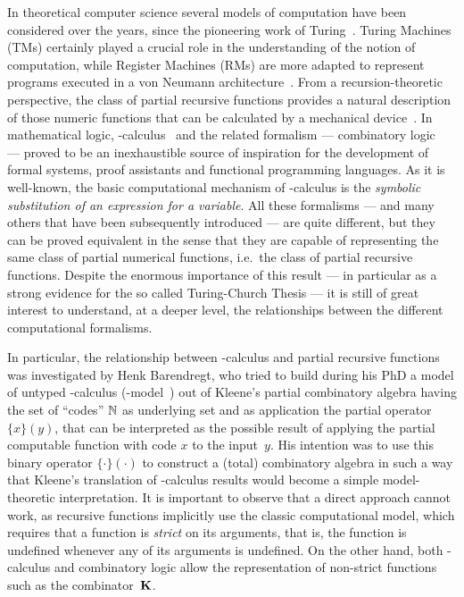 In theoretical computer science several models of computation have been considered over the years, since the pioneering work of Turing~\cite{Turing36}.
Turing Machines (TMs) certainly played a crucial role in the understanding of the notion of computation, while Register Machines (RMs) are more adapted to represent programs executed in a von Neumann architecture~\cite{Rogers67}.
From a recursion-theoretic perspective, the class of partial recursive functions provides a natural description of those numeric functions that can be calculated by a mechanical device~\cite{Kleene36}.
In mathematical logic, \lam-calculus~\cite{Bare} and the related formalism --- combinatory logic~\cite{CurryF58} --- proved to be an inexhaustible source of inspiration for the development of formal systems, proof assistants and functional programming languages. As it is well-known, the basic computational mechanism of \lam-calculus is the {\em symbolic substitution of an expression for a variable}.
All these formalisms --- and many others that have been subsequently introduced --- are quite different, but they can be proved equivalent in the sense that they are capable of representing the same class of partial numerical functions, i.e.\ the class of partial recursive functions.
Despite the enormous importance of this result --- in particular as a strong evidence for the so called Turing-Church Thesis --- it is still of great interest to understand, at a deeper level, the relationships between the different computational formalisms.

In particular, the relationship between \lam-calculus and partial recursive functions was investigated by Henk Barendregt, who tried to build during his PhD a model of untyped \lam-calculus (\lam-model~\cite{Koymans82,Meyer82}) out of Kleene's partial combinatory algebra having the set of ``codes'' $\mathbb{N}$ as underlying set and as application the partial operator $\{x\}(y)$, that can be interpreted as the possible result of applying the partial computable function with code $x$ to the input~$y$.
His intention was to use this binary operator $\{\cdot\}(\cdot)$ to construct a (total) combinatory algebra in such a way that Kleene's translation of \lam-calculus results would become a simple model-theoretic interpretation. It is important to observe that a direct approach cannot work, as recursive functions implicitly use the classic computational model, which requires that a function is \emph{strict} on its arguments, that is, the function is undefined whenever any of its arguments is undefined. On the other hand, both \lam-calculus and combinatory logic allow the representation of non-strict functions such as the combinator~${\mathbf{K}}$.

